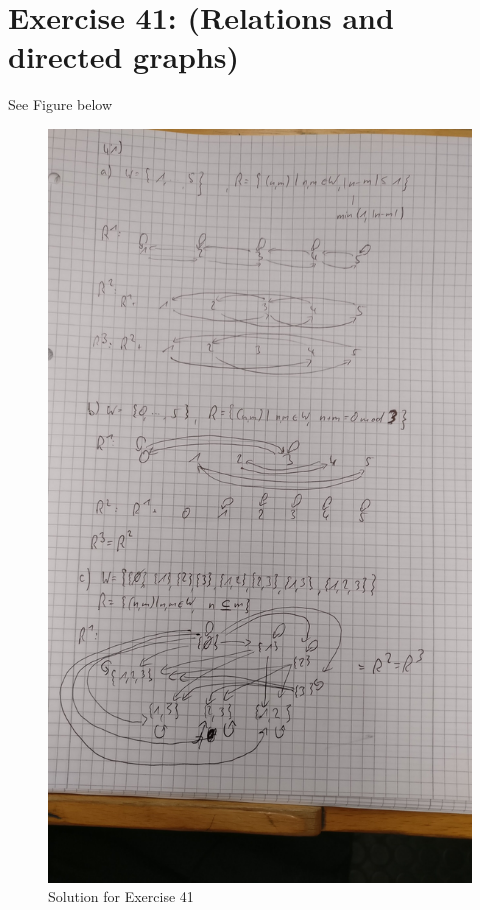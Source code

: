 \documentclass[12pt]{article}
\begin{document}
 

\rhead{\today}


\section*{Exercise 41: (Relations and directed graphs)}

See Figure below

\begin{figure}[ht]
	\includegraphics[scale=0.1475]{../pics/41.jpeg}
	\caption{Solution for Exercise 41}
\end{figure}
\end{document}
